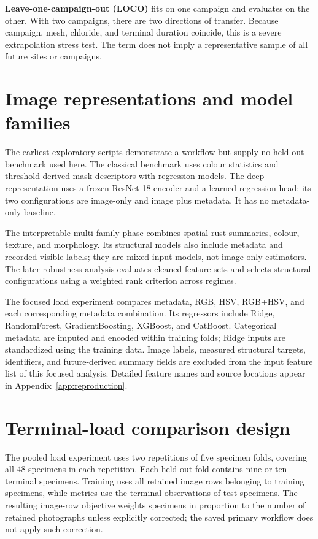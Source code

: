 \textbf{Leave-one-campaign-out (LOCO)} fits on one campaign and evaluates on the other. With two campaigns, there are two directions of transfer. Because campaign, mesh, chloride, and terminal duration coincide, this is a severe extrapolation stress test. The term does not imply a representative sample of all future sites or campaigns.


\section{Image representations and model families}
The earliest exploratory scripts demonstrate a workflow but supply no held-out benchmark used here. The classical benchmark uses colour statistics and threshold-derived mask descriptors with regression models. The deep representation uses a frozen ResNet-18 encoder and a learned regression head; its two configurations are image-only and image plus metadata. It has no metadata-only baseline.

The interpretable multi-family phase combines spatial rust summaries, colour, texture, and morphology. Its structural models also include metadata and recorded visible labels; they are mixed-input models, not image-only estimators. The later robustness analysis evaluates cleaned feature sets and selects structural configurations using a weighted rank criterion across regimes.

The focused load experiment compares metadata, RGB, HSV, RGB+HSV, and each corresponding metadata combination. Its regressors include Ridge, RandomForest, GradientBoosting, XGBoost, and CatBoost. Categorical metadata are imputed and encoded within training folds; Ridge inputs are standardized using the training data. Image labels, measured structural targets, identifiers, and future-derived summary fields are excluded from the input feature list of this focused analysis. Detailed feature names and source locations appear in Appendix~\ref{app:reproduction}.

\section{Terminal-load comparison design}\label{sec:capacitydesign}
The pooled load experiment uses two repetitions of five specimen folds, covering all 48 specimens in each repetition. Each held-out fold contains nine or ten terminal specimens. Training uses all retained image rows belonging to training specimens, while metrics use the terminal observations of test specimens. The resulting image-row objective weights specimens in proportion to the number of retained photographs unless explicitly corrected; the saved primary workflow does not apply such correction.

